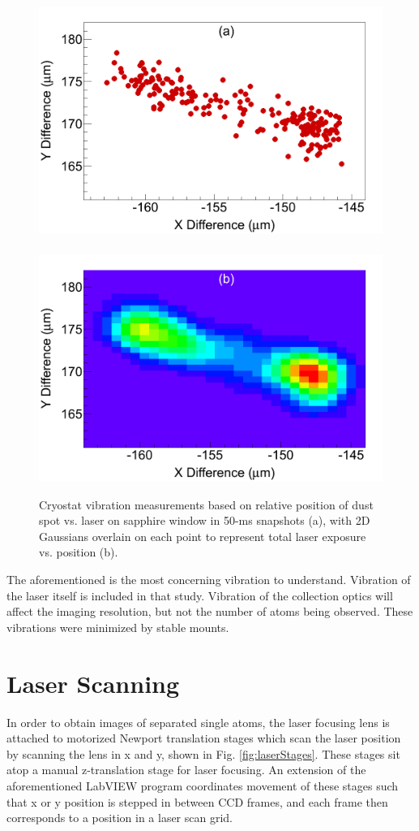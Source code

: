 
\begin{figure} %
        \centering
                \includegraphics[width=.5\textwidth]{figures/cryovibes_a.png}
                ~
                \includegraphics[width=.5\textwidth]{figures/cryovibes_b.png}
                \caption{Cryostat vibration measurements based on relative position of dust spot vs. laser on sapphire window in 50-ms snapshots (a), with 2D Gaussians overlain on each point to represent total laser exposure vs. position (b).}
\label{fig:cryovibe2D}
\end{figure}

The aforementioned is the most concerning vibration to understand.  Vibration of the laser itself is included in that study.  Vibration of the collection optics will affect the imaging resolution, but not the number of atoms being observed.  These vibrations were minimized by stable mounts.

\section{Laser Scanning}
\label{sec:laserscanning}

In order to obtain images of separated single atoms, the laser focusing lens is attached to motorized Newport translation stages which scan the laser position by scanning the lens in x and y, shown in Fig. \ref{fig:laserStages}.  These stages sit atop a manual z-translation stage for laser focusing.  An extension of the aforementioned LabVIEW program coordinates movement of these stages such that x or y position is stepped in between CCD frames, and each frame then corresponds to a position in a laser scan grid.

